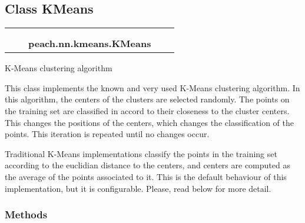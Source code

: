 
\subsection{Class KMeans}

    \label{peach:nn:kmeans:KMeans}
\begin{tabular}{cccccc}
\multicolumn{2}{r}{\settowidth{\BCL}{object}\multirow{2}{\BCL}{object}}
&&
  \\\cline{3-3}
  &&\multicolumn{1}{c|}{}
&&
  \\
&&\multicolumn{2}{l}{\textbf{peach.nn.kmeans.KMeans}}
\end{tabular}


K-Means clustering algorithm

This class implements the known and very used K-Means clustering algorithm.
In this algorithm, the centers of the clusters are selected randomly. The
points on the training set are classified in accord to their closeness to
the cluster centers. This changes the positions of the centers, which
changes the classification of the points. This iteration is repeated until
no changes occur.

Traditional K-Means implementations classify the points in the training set
according to the euclidian distance to the centers, and centers are computed
as the average of the points associated to it. This is the default behaviour
of this implementation, but it is configurable. Please, read below for more
detail.


  \subsubsection{Methods}

    \vspace{0.5ex}

